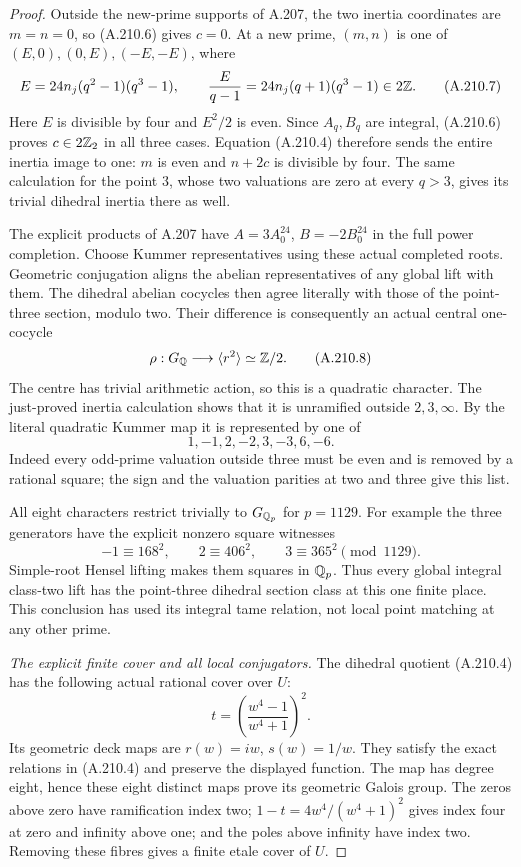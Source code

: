 \begin{proof}
Outside the new-prime supports of A.207, the two inertia
coordinates are \(m=n=0\), so (A.210.6) gives \(c=0\).
At a new prime, \((m,n)\) is one of
\((E,0),(0,E),(-E,-E)\), where
\[
 E=24n_j(q^2-1)(q^3-1),\qquad
          \frac{E}{q-1}=24n_j(q+1)(q^3-1)\in2\mathbb Z.
\tag{A.210.7}
\]
Here \(E\) is divisible by four and \(E^2/2\) is even.
Since \(A_q,B_q\) are integral, (A.210.6) proves
\(c\in2\mathbb Z_2\) in all three cases.
Equation (A.210.4) therefore sends the entire inertia
image to one: \(m\) is even and \(n+2c\) is divisible
by four.  The same calculation for the point \(3\),
whose two valuations are zero at every \(q>3\), gives
its trivial dihedral inertia there as well.

The explicit products of A.207 have
\(A=3A_0^{24}\), \(B=-2B_0^{24}\) in the full power
completion.  Choose Kummer representatives using these
actual completed roots.  Geometric conjugation aligns
the abelian representatives of any global lift with them.
The dihedral abelian cocycles then agree literally with
those of the point-three section, modulo two.
Their difference is consequently an actual central
one-cocycle
\[
                \rho:G_\mathbb Q\longrightarrow\langle r^2\rangle
                                      \simeq\mathbb Z/2.
\tag{A.210.8}
\]
The centre has trivial arithmetic action, so this is a
quadratic character.  The just-proved inertia calculation
shows that it is unramified outside \(2,3,\infty\).
By the literal quadratic Kummer map it is represented by
one of
\[
                           1,-1,2,-2,3,-3,6,-6.
\tag{A.210.9}
\]
Indeed every odd-prime valuation outside three must be
even and is removed by a rational square; the sign and
the valuation parities at two and three give this list.

All eight characters restrict trivially to \(G_{\mathbb Q_p}\)
for \(p=1129\).  For example the three generators have
the explicit nonzero square witnesses
\[
                -1\equiv168^2,\qquad
                 2\equiv406^2,\qquad
                 3\equiv365^2\pmod {1129}.
\tag{A.210.10}
\]
Simple-root Hensel lifting makes them squares in
\(\mathbb Q_p\).  Thus every global integral class-two lift
has the point-three dihedral section class at this
one finite place.  This conclusion has used its
integral tame relation, not local point matching at
any other prime.

\emph{The explicit finite cover and all local conjugators.}
The dihedral quotient (A.210.4) has the following
actual rational cover over \(U\):
\[
          t=\left(\frac{w^4-1}{w^4+1}\right)^2.
\tag{A.210.11}
\]
Its geometric deck maps are
\(r(w)=iw\), \(s(w)=1/w\).  They satisfy the exact
relations in (A.210.4) and preserve the displayed
function.  The map has degree eight, hence these eight
distinct maps prove its geometric Galois group.
The zeros above zero have ramification index two;
\(1-t=4w^4/(w^4+1)^2\) gives index four at zero and
infinity above one; and the poles above infinity have
index two.  Removing these fibres gives a finite etale
cover of \(U\).


\end{proof}
